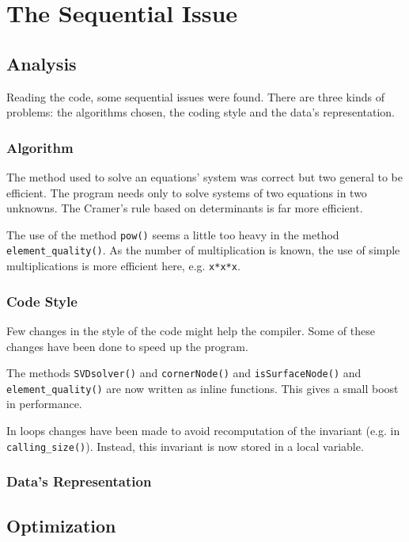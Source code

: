 \documentclass{egpubl}
\begin{document}
\section{The Sequential Issue}

\subsection{Analysis}

Reading the code, some sequential issues were found. There are three kinds of problems: the algorithms chosen, the coding style and the data's representation.

\subsubsection{Algorithm}

The method used to solve an equations' system was correct but two general to be efficient. The program needs only to solve systems of two equations in two unknowns. The Cramer's rule based on determinants is far more efficient.

The use of the method \verb+pow()+ seems a little too heavy in the method \verb+element_quality()+. As the number of multiplication is known, the use of simple multiplications is more efficient here, e.g. \verb+x*x*x+.

\subsubsection{Code Style}

Few changes in the style of the code might help the compiler. Some of these changes have been done to speed up the program.

The methods \verb+SVDsolver()+ and \verb+cornerNode()+ and \verb+isSurfaceNode()+ and \verb+element_quality()+ are now written as inline functions. This gives a small boost in performance.

In loops changes have been made to avoid recomputation of the invariant (e.g. in \verb+calling_size()+). Instead, this invariant is now stored in a local variable.

\subsubsection{Data's Representation}



\subsection{Optimization}
\end{document}
